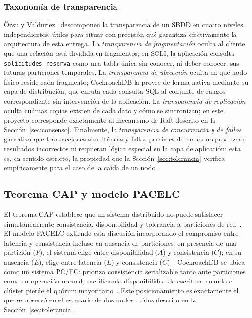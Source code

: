 \documentclass[10pt,twocolumn]{article}
\begin{document}
\subsubsection{Taxonomía de transparencia}

Özsu y Valduriez~\cite{ozsu2020} descomponen la transparencia de un SBDD en
cuatro niveles independientes, útiles para situar con precisión qué
garantiza efectivamente la arquitectura de esta entrega. La
\emph{transparencia de fragmentación} oculta al cliente que una relación
está dividida en fragmentos; en SCLI, la aplicación consulta
\texttt{solicitudes\_reserva} como una tabla única sin conocer, ni deber
conocer, sus futuras particiones temporales. La \emph{transparencia de
ubicación} oculta en qué nodo físico reside cada fragmento; CockroachDB la
provee de forma nativa mediante su capa de distribución, que enruta cada
consulta SQL al conjunto de rangos correspondiente sin intervención de la
aplicación. La \emph{transparencia de replicación} oculta cuántas copias
existen de cada dato y cómo se sincronizan; en este proyecto corresponde
exactamente al mecanismo de Raft descrito en la
Sección~\ref{sec:consenso}. Finalmente, la \emph{transparencia de
concurrencia y de fallos} garantiza que transacciones simultáneas y fallos
parciales de nodos no produzcan resultados incorrectos ni requieran lógica
especial en la capa de aplicación; esta es, en sentido estricto, la
propiedad que la Sección~\ref{sec:tolerancia} verifica empíricamente para
el caso de la caída de un nodo.

\subsection{Teorema CAP y modelo PACELC}

El teorema CAP establece que un sistema distribuido no puede satisfacer
simultáneamente consistencia, disponibilidad y tolerancia a particiones de
red~\cite{lee2023cap}. El modelo PACELC extiende esta discusión
incorporando el compromiso entre latencia y consistencia incluso en
ausencia de particiones: en presencia de una partición ($P$), el sistema
elige entre disponibilidad ($A$) y consistencia ($C$); en su ausencia
($E$), elige entre latencia ($L$) y consistencia ($C$)~\cite{lee2023cap}.
CockroachDB se ubica como un sistema \mbox{PC/EC}: prioriza consistencia
serializable tanto ante particiones como en operación normal, sacrificando
disponibilidad de escritura cuando el clúster pierde el quórum
mayoritario~\cite{taft2020}. Este posicionamiento es exactamente el que se
observó en el escenario de dos nodos caídos descrito en la
Sección~\ref{sec:tolerancia}.
\end{document}
